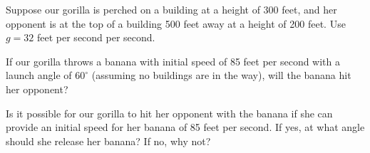 \begin{activity} \label{A:9.7.11} Suppose our gorilla is perched on a building at a height of 300 feet, and her opponent is at the top of a building 500 feet away at a height of 200 feet. Use $g = 32$ feet per second per second.
    \ba
    \item If our gorilla throws a banana with initial speed of 85 feet per second with a launch angle of $60^{\circ}$ (assuming no buildings are in the way), will the banana hit her opponent?



    \item Is it possible for our gorilla to hit her opponent with the banana if she can provide an initial speed for her banana of 85 feet per second. If yes, at what angle should she release her banana? If no, why not?



    \ea

\end{activity}
\begin{smallhint}

\end{smallhint}
\begin{bighint}

\end{bighint}
\begin{activitySolution}

\end{activitySolution}
\aftera
